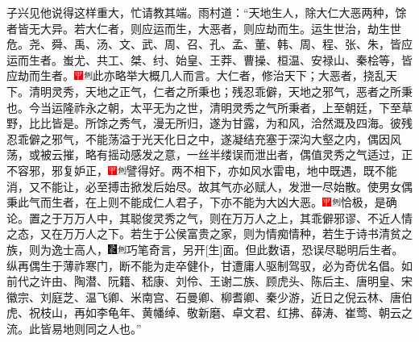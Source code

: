 子兴见他说得这样重大，忙请教其端。雨村道：``天地生人，除大仁大恶两种，馀者皆无大异。若大仁者，则应运而生，大恶者，则应劫而生。运生世治，劫生世危。尧、舜、禹、汤、文、武、周、召、孔、孟、董、韩、周、程、张、朱，皆应运而生者。蚩尤、共工、桀、纣、始皇、王莽、曹操、桓温、安禄山、秦桧等，皆应劫而生者。{\includegraphics[width=3mm]{../Images/00002}\includegraphics[width=3mm]{../Images/00011}\footnotesize \kaishu 此亦略举大概几人而言。}大仁者，修治天下；大恶者，挠乱天下。清明灵秀，天地之正气，仁者之所秉也；残忍乖僻，天地之邪气，恶者之所秉也。今当运隆祚永之朝，太平无为之世，清明灵秀之气所秉者，上至朝廷，下至草野，比比皆是。所馀之秀气，漫无所归，遂为甘露，为和风，洽然溉及四海。彼残忍乖僻之邪气，不能荡溢于光天化日之中，遂凝结充塞于深沟大壑之内，偶因风荡，或被云摧，略有摇动感发之意，一丝半缕误而泄出者，偶值灵秀之气适过，正不容邪，邪复妒正，{\includegraphics[width=3mm]{../Images/00002}\includegraphics[width=3mm]{../Images/00011}\footnotesize \kaishu 譬得好。}两不相下，亦如风水雷电，地中既遇，既不能消，又不能让，必至搏击掀发后始尽。故其气亦必赋人，发泄一尽始散。使男女偶秉此气而生者，在上则不能成仁人君子，下亦不能为大凶大恶。{\includegraphics[width=3mm]{../Images/00002}\includegraphics[width=3mm]{../Images/00011}\footnotesize \kaishu 恰极，是确论。}置之于万万人中，其聪俊灵秀之气，则在万万人之上，其乖僻邪谬、不近人情之态，又在万万人之下。若生于公侯富贵之家，则为情痴情种，若生于诗书清贫之族，则为逸士高人，{\includegraphics[width=3mm]{../Images/00006}\includegraphics[width=3mm]{../Images/00011}\footnotesize \kaishu 巧笔奇言，另开{[}生{]}面。但此数语，恐误尽聪明后生者。}纵再偶生于薄祚寒门，断不能为走卒健仆，甘遭庸人驱制驾驭，必为奇优名倡。如前代之许由、陶潜、阮籍、嵇康、刘伶、王谢二族、顾虎头、陈后主、唐明皇、宋徽宗、刘庭芝、温飞卿、米南宫、石曼卿、柳耆卿、秦少游，近日之倪云林、唐伯虎、祝枝山，再如李龟年、黄幡绰、敬新磨、卓文君、红拂、薛涛、崔莺、朝云之流。此皆易地则同之人也。''


